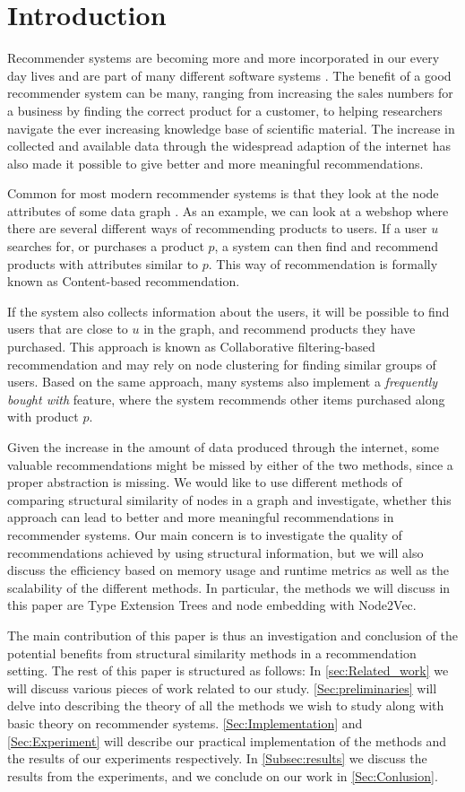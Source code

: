\section{Introduction}
  Recommender systems are becoming more and more incorporated in our every day lives and are part of many different software systems \cite{recommender_e-comerce}. The benefit of a good recommender system can be many,  ranging from increasing the sales numbers for a business by finding the correct product for a customer, to helping researchers navigate the ever increasing knowledge base of scientific material. The increase in collected and available data through the widespread adaption of the internet has also made it possible to give better and more meaningful recommendations.

  Common for most modern recommender systems is that they look at the node attributes of some data graph \cite{Ricci2015}. As an example, we can look at a webshop where there are several different ways of recommending products to users. If a user $u$ searches for, or purchases a product $p$, a system can then find and recommend products with attributes similar to $p$. This way of recommendation is formally known as Content-based recommendation.

  If the system also collects information about the users, it will be possible to find users that are close to $u$ in the graph, and recommend products they have purchased. This approach is known as Collaborative filtering-based recommendation and may rely on node clustering for finding similar groups of users. Based on the same approach, many systems also implement a \textit{frequently bought with} feature, where the system recommends other items purchased along with product $p$.

  Given the increase in the amount of data produced through the internet, some valuable recommendations might be missed by either of the two methods, since a proper abstraction is missing. We would like to use different methods of comparing structural similarity of nodes in a graph and investigate, whether this approach can lead to better and more meaningful recommendations in recommender systems. Our main concern is to investigate the quality of recommendations achieved by using structural information, but we will also discuss the efficiency based on memory usage and runtime metrics as well as the scalability of the different methods. In particular, the methods we will discuss in this paper are Type Extension Trees and node embedding with Node2Vec.

  The main contribution of this paper is thus an investigation and conclusion of the potential benefits from structural similarity methods in a recommendation setting.
  The rest of this paper is structured as follows:
  In \autoref{sec:Related_work} we will discuss various pieces of work related to our study.
  \autoref{Sec:preliminaries} will delve into describing the theory of all the methods we wish to study along with basic theory on recommender systems.
  \autoref{Sec:Implementation} and \autoref{Sec:Experiment} will describe our practical implementation of the methods and the results of our experiments respectively.
  In \autoref{Subsec:results} we discuss the results from the experiments, and we conclude on our work in \autoref{Sec:Conlusion}.
